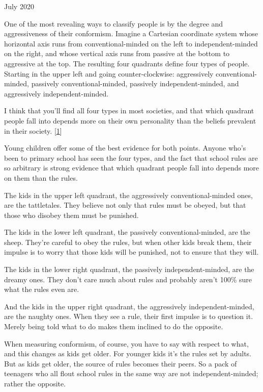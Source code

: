 July 2020

One of the most revealing ways to classify people is by the degree and
aggressiveness of their conformism. Imagine a Cartesian coordinate
system whose horizontal axis runs from conventional-minded on the left
to independent-minded on the right, and whose vertical axis runs from
passive at the bottom to aggressive at the top. The resulting four
quadrants define four types of people. Starting in the upper left and
going counter-clockwise: aggressively conventional-minded, passively
conventional-minded, passively independent-minded, and aggressively
independent-minded.

I think that you'll find all four types in most societies, and that
which quadrant people fall into depends more on their own personality
than the beliefs prevalent in their society. {[}\hyperref[f1n]{1}{]}

Young children offer some of the best evidence for both points. Anyone
who's been to primary school has seen the four types, and the fact that
school rules are so arbitrary is strong evidence that which quadrant
people fall into depends more on them than the rules.

The kids in the upper left quadrant, the aggressively
conventional-minded ones, are the tattletales. They believe not only
that rules must be obeyed, but that those who disobey them must be
punished.

The kids in the lower left quadrant, the passively conventional-minded,
are the sheep. They're careful to obey the rules, but when other kids
break them, their impulse is to worry that those kids will be punished,
not to ensure that they will.

The kids in the lower right quadrant, the passively independent-minded,
are the dreamy ones. They don't care much about rules and probably
aren't 100\% sure what the rules even are.

And the kids in the upper right quadrant, the aggressively
independent-minded, are the naughty ones. When they see a rule, their
first impulse is to question it. Merely being told what to do makes them
inclined to do the opposite.

When measuring conformism, of course, you have to say with respect to
what, and this changes as kids get older. For younger kids it's the
rules set by adults. But as kids get older, the source of rules becomes
their peers. So a pack of teenagers who all flout school rules in the
same way are not independent-minded; rather the opposite.

